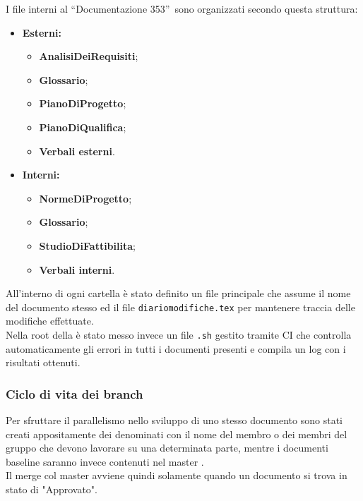 \documentclass[NormeDiProgetto.tex]{subfiles}
\begin{document}
	I file interni al  \textquotedblleft Documentazione 353\textquotedblright\ sono organizzati secondo questa struttura:
	\begin{itemize}
		\item \textbf{Esterni:}
				\begin{itemize}
				\item \textbf{AnalisiDeiRequisiti};
				\item \textbf{Glossario};
				\item \textbf{PianoDiProgetto};
				\item \textbf{PianoDiQualifica};
				\item \textbf{Verbali esterni}.
			\end{itemize}
		\item \textbf{Interni:}
				\begin{itemize}
					\item \textbf{NormeDiProgetto};
					\item \textbf{Glossario};
					\item \textbf{StudioDiFattibilita};
					\item \textbf{Verbali interni}.
				\end{itemize}		
	\end{itemize}	
	All'interno di ogni cartella è stato definito un file  principale che assume il nome del documento stesso ed il file \texttt{diariomodifiche.tex} per mantenere traccia delle modifiche effettuate.\\
	Nella root della  è stato messo invece un file \texttt{.sh} gestito tramite  CI che controlla automaticamente gli errori in tutti i documenti presenti e compila un log con i risultati ottenuti.
	
	\subsubsection{Ciclo di vita dei branch}
	Per sfruttare il parallelismo nello sviluppo di uno stesso documento sono stati creati appositamente dei  denominati con il nome del membro o dei membri del gruppo che devono lavorare su una determinata parte, mentre i documenti baseline saranno invece contenuti nel master .\\
	Il merge col master avviene quindi solamente quando un documento si trova in stato di "Approvato".
	
\end{document}
